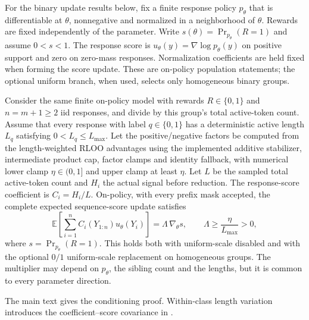 For the binary update results below, fix a finite response policy
$p_\theta$ that is differentiable at $\theta$, nonnegative and normalized
in a neighborhood of $\theta$. Rewards are fixed independently of the
parameter. Write $s(\theta)=\Pr_{p_\theta}(R=1)$ and assume $0<s<1$.
The response score is $u_\theta(y)=\nabla\log p_\theta(y)$ on positive
support and zero on zero-mass responses. Normalization coefficients are
held fixed when forming the score update. These are on-policy population
statements; the optional uniform branch, when used, selects only
homogeneous binary groups.

\begin{proposition}
\label{prop:binary-complete-update}
Consider the same finite on-policy model with rewards $R\in\{0,1\}$
and $n=m+1\ge2$ iid responses, and divide by this group's total active-token count. Assume that every response with
label $q\in\{0,1\}$ has a deterministic active length $L_q$ satisfying
$0<L_q\le L_{\max}$. Let the positive/negative factors be computed from
the length-weighted RLOO advantages using the implemented additive
stabilizer, intermediate product cap, factor clamps and identity fallback,
with numerical lower clamp $\eta\in(0,1]$ and upper clamp at least $\eta$.
Let $L$ be the sampled total active-token count and $H_i$ the actual
signal before reduction. The response-score coefficient is $C_i=H_i/L$. On-policy, with every prefix mask accepted, the complete expected sequence-score update satisfies
\begin{equation*}
    \mathbb E\!\left[\sum_{i=1}^{n}C_i(Y_{1:n})
        u_\theta(Y_i)\right]
      = \Lambda\,\nabla_\theta s,
    \qquad
    \Lambda\ge \frac{\eta}{L_{\max}}>0,
\end{equation*}
where $s=\Pr_{p_\theta}(R=1)$. This holds both with uniform-scale
disabled and with the optional $0/1$ uniform-scale replacement on homogeneous
groups. The multiplier may depend on $p_\theta$, the sibling count and the
lengths, but it is common to every parameter direction.
\end{proposition}

The main text gives the conditioning proof. Within-class length variation
introduces the coefficient--score covariance in
.

